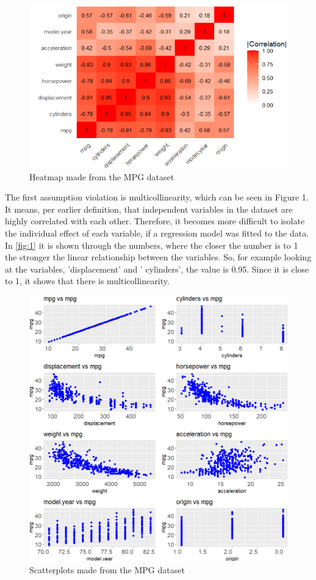 \begin{figure}
	\centering
	\centering
	\includegraphics{billder/1.png}
	\caption{Heatmap made from the MPG dataset}
	\label{fig:1}
\end{figure}

\noindent The first assumption violation is multicollinearity, which can be seen in Figure 1. It means, per earlier definition, that independent variables in the dataset are highly correlated with each other. Therefore, it becomes more difficult to isolate the individual effect of each variable, if a regression model was fitted to the data. In \autoref{fig:1} it is shown through the numbers, where the closer the number is to 1 the stronger the  linear relationship between the variables. So, for example looking at the variables, 'displacement' and ' cylinders', the value is 0.95. Since it is close to 1, it shows that there is multicollinearity. \newline


\begin{figure}
	\includegraphics[width=\linewidth]{billder/2.png}
	\caption{Scatterplots made from the MPG dataset}
	\label{fig:2}
\end{figure}

